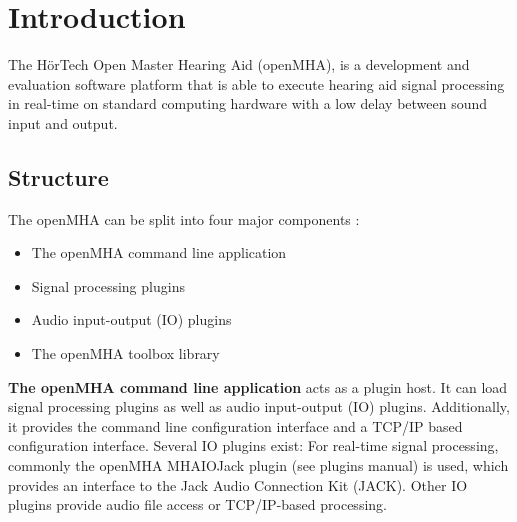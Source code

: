 \section{Introduction}
The H\"{o}rTech Open Master Hearing Aid (openMHA), is a development and evaluation software platform that is able to execute hearing aid signal processing in real-\/time on standard computing hardware with a low delay between sound input and output.

\subsection{Structure}\label{index_str}
The openMHA can be split into four major components :
\begin{itemize}
\item The openMHA command line application
\item Signal processing plugins
\item Audio input-\/output (IO) plugins
\item The openMHA toolbox library
\end{itemize} 

{\bf The openMHA command line application} acts as a plugin host. It can load signal processing plugins as well as audio input-\/output (IO) plugins. Additionally, it provides the command line configuration interface and a TCP/IP based configuration interface. Several IO plugins exist: For real-\/time signal processing, commonly the openMHA MHAIOJack plugin (see plugins\textquotesingle{} manual) is used, which provides an interface to the Jack Audio Connection Kit (JACK). Other IO plugins provide audio file access or TCP/IP-\/based processing.

